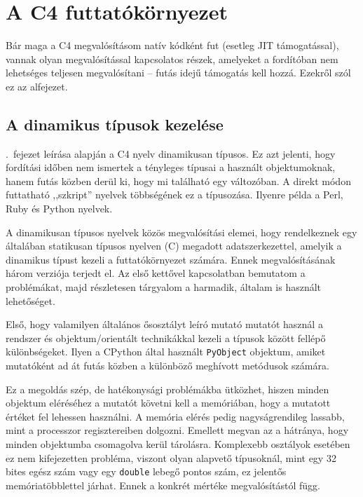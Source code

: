 \section{A C4 futtatókörnyezet}\label{sec:c4:rt}

Bár maga a C4 megvalósításom natív kódként fut (esetleg \gls{JIT} támogatással), vannak olyan megvalósítással kapcsolatos részek, amelyeket a fordítóban nem lehetséges teljesen megvalósítani -- futás idejű támogatás kell hozzá.
Ezekről szól ez az alfejezet.

\subsection{A dinamikus típusok kezelése}\label{subsec:c4:rt:types}

.~fejezet leírása alapján a C4 nyelv dinamikusan típusos.
Ez azt jelenti, hogy fordítási időben nem ismertek a tényleges típusai a használt objektumoknak, hanem futás közben derül ki, hogy mi található egy változóban.
A direkt módon futtatható \un ,,szkript'' nyelvek többségének ez a típusozása.
Ilyenre példa a Perl, Ruby és Python nyelvek.

A dinamikusan típusos nyelvek közös megvalósítási elemei, hogy rendelkeznek egy általában statikusan típusos nyelven (\pl C) megadott adatszerkezettel, amelyik a dinamikus típust kezeli a futtatókörnyezet számára.
Ennek megvalósításának három verziója terjedt el.
Az első kettővel kapcsolatban bemutatom a problémákat, majd részletesen tárgyalom a harmadik, általam is használt lehetőséget.

Első, hogy valamilyen általános ősosztályt leíró mutató mutatót használ a rendszer és objektum\-/orientált technikákkal kezeli a típusok között fellépő különbségeket.
Ilyen a CPython által használt {\tt PyObject} objektum, amiket mutatóként ad át futás közben a különböző meghívott metódusok számára.

Ez a megoldás szép, de hatékonysági problémákba ütközhet, hiszen minden objektum eléréséhez a mutatót követni kell a memóriában, hogy a mutatott értéket fel lehessen használni.
A memória elérés pedig nagyságrendileg lassabb, mint a processzor regisztereiben dolgozni.
Emellett megvan az a hátránya, hogy minden objektumba csomagolva kerül tárolásra.
Komplexebb osztályok esetében ez nem kifejezetten probléma, viszont olyan alapvető típusoknál, mint egy 32 bites egész szám vagy egy {\tt double} lebegő pontos szám, ez jelentős memóriatöbblettel járhat.
Ennek a konkrét mértéke megvalósítástól függ.

